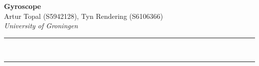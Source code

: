 \documentclass[a4paper,9pt]{article}
\renewenvironment{abstract}
 {\par\noindent\textbf{\abstractname}\ \ignorespaces \\}
 {\par\noindent\medskip}
\begin{document}
\pagestyle{fancy}
\thispagestyle{empty}
\fancyhead[L]{}

\renewcommand*{\thefootnote}{\fnsymbol{footnote}}

\begin{center}
\Large{\textbf{Gyroscope}}
\vspace{0.4cm}
\normalsize
\\ Artur Topal (S5942128), Tyn Rendering (S6106366) \\
\vspace{0.1cm}
\textit{University of Groningen}
\medskip
\normalsize
\end{center}

\vspace{3cm}
{\color{gray}\hrule}
\vspace{0.4cm}

\begin{abstract}

\end{abstract}

{\color{gray}\hrule}
\medskip

\pagebreak
\tableofcontents
\pagebreak







\appendix



\printbibliography
\end{document}
